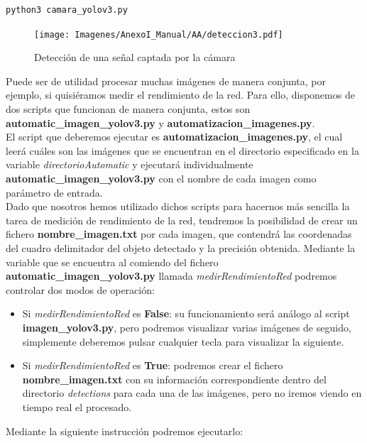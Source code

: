 \begin{lstlisting}
python3 camara_yolov3.py
\end{lstlisting}

\begin{figure}[H]
	\centering
	\texttt{[image: Imagenes/AnexoI\_Manual/AA/deteccion3.pdf]}
	\caption{Detección de una señal captada por la cámara}
	\label{detecc3}
\end{figure}

Puede ser de utilidad procesar muchas imágenes de manera conjunta, por ejemplo, si quisiéramos medir el rendimiento de la red. Para ello, disponemos de dos scripts que funcionan de manera conjunta, estos son \textbf{automatic_imagen_yolov3.py} y \textbf{automatizacion_imagenes.py}.\\

El script que deberemos ejecutar es \textbf{automatizacion_imagenes.py}, el cual leerá cuáles son las imágenes que se encuentran en el directorio especificado en la variable \textit{directorioAutomatic} y ejecutará individualmente \textbf{automatic_imagen_yolov3.py} con el nombre de cada imagen como parámetro de entrada.\\

Dado que nosotros hemos utilizado dichos scripts para hacernos más sencilla la tarea de medición de rendimiento de la red, tendremos la posibilidad de crear un fichero \textbf{nombre_imagen.txt} por cada imagen, que contendrá las coordenadas del cuadro delimitador del objeto detectado y la precisión obtenida. Mediante la variable que se encuentra al comiendo del fichero \textbf{automatic_imagen_yolov3.py} llamada \textit{medirRendimientoRed} podremos controlar dos modos de operación:

\begin{itemize}
\item Si \textit{medirRendimientoRed} es \textbf{False}: su funcionamiento será análogo al script \textbf{imagen_yolov3.py}, pero podremos visualizar varias imágenes de seguido, simplemente deberemos pulsar cualquier tecla para visualizar la siguiente. 

\item Si \textit{medirRendimientoRed} es \textbf{True}: podremos crear el fichero \textbf{nombre_imagen.txt} con su información correspondiente dentro del directorio \textit{detections} para cada una de las imágenes, pero no iremos viendo en tiempo real el procesado.
\end{itemize}

Mediante la siguiente instrucción podremos ejecutarlo:

